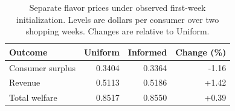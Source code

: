 \begin{table}[htbp]
\centering\small
\caption{Separate flavor prices under observed first-week initialization. Levels are dollars per consumer over two shopping weeks. Changes are relative to Uniform.}
\label{tab:weekly-separate-welfare}
\begin{tabular}{lrrr}
\toprule
Outcome & Uniform & Informed & Change (\%) \\
\midrule
Consumer surplus & 0.3404 & 0.3364 & -1.16 \\
Revenue & 0.5113 & 0.5186 & +1.42 \\
Total welfare & 0.8517 & 0.8550 & +0.39 \\
\bottomrule
\end{tabular}
\end{table}
